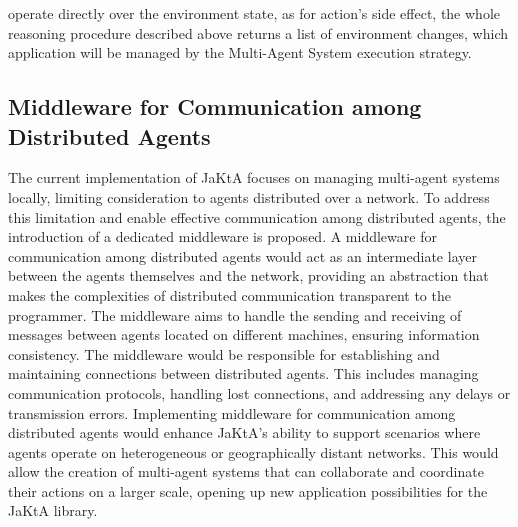 operate directly over the environment state, as for action's side effect, the whole reasoning procedure described above returns a list of environment changes, which application will be managed by the Multi-Agent System execution strategy.

\subsection{Middleware for Communication among Distributed Agents}

The current implementation of JaKtA focuses on managing multi-agent systems locally, limiting consideration to agents distributed over a network. To address this limitation and enable effective communication among distributed agents, the introduction of a dedicated middleware is proposed.
A middleware for communication among distributed agents would act as an intermediate layer between the agents themselves and the network, providing an abstraction that makes the complexities of distributed communication transparent to the programmer. The middleware aims to handle the sending and receiving of messages between agents located on different machines, ensuring information consistency.
The middleware would be responsible for establishing and maintaining connections between distributed agents. This includes managing communication protocols, handling lost connections, and addressing any delays or transmission errors.
Implementing middleware for communication among distributed agents would enhance JaKtA's ability to support scenarios where agents operate on heterogeneous or geographically distant networks. This would allow the creation of multi-agent systems that can collaborate and coordinate their actions on a larger scale, opening up new application possibilities for the JaKtA library.
